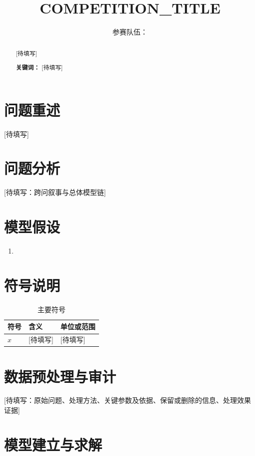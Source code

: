 \documentclass[UTF8,a4paper,12pt]{ctexart}
\title{ {{COMPETITION_TITLE}} }
\author{参赛队伍：\underline{\hspace{4cm}}}
\date{}
\begin{document}
\maketitle

\begin{abstract}
[待填写]

\textbf{关键词：} [待填写]
\end{abstract}

\section{问题重述}
[待填写]

\section{问题分析}
[待填写：跨问叙事与总体模型链]

\section{模型假设}
\begin{enumerate}[label=\arabic*.]
  \item [待填写：团队引入的假设或口径、理由、适用范围及潜在偏差]
\end{enumerate}

\section{符号说明}
\begin{table}[H]
  \centering
  \caption{主要符号}
  \begin{tabular}{lll}
    \toprule
    符号 & 含义 & 单位或范围 \\
    \midrule
    $x$ & [待填写] & [待填写] \\
    \bottomrule
  \end{tabular}
\end{table}

\section{数据预处理与审计}
[待填写：原始问题、处理方法、关键参数及依据、保留或删除的信息、处理效果证据]

\section{模型建立与求解}
\end{document}
